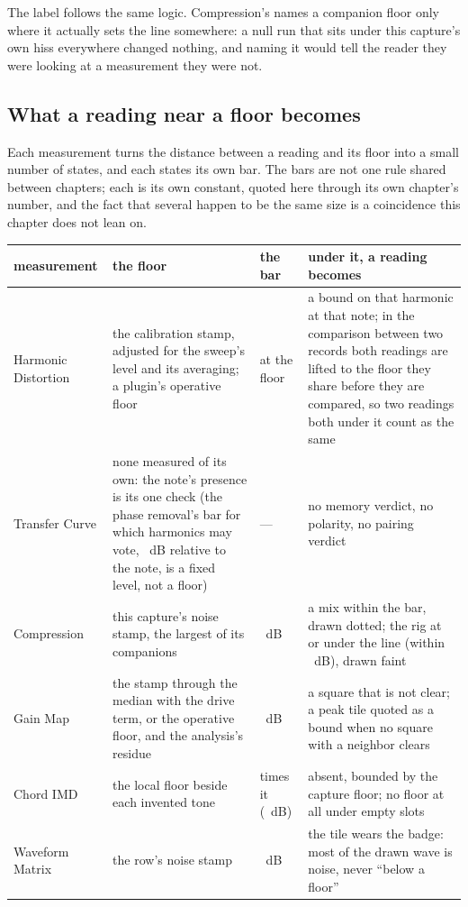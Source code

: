 \documentclass[11pt,a4paper]{article}
\begin{document}
The label follows the same logic. Compression's 
names a companion floor only where it actually sets the line somewhere:
a null run that sits under this capture's own hiss everywhere changed
nothing, and naming it would tell the reader they were looking at a
measurement they were not.

\subsection{What a reading near a floor becomes}

Each measurement turns the distance between a reading and its floor into
a small number of states, and each states its own bar. The bars are not
one rule shared between chapters; each is its own constant, quoted here
through its own chapter's number, and the fact that several happen to be
the same size is a coincidence this chapter does not lean on.

\begin{center}\small
\begin{tabular}{@{}p{2.6cm}p{4.2cm}p{2.3cm}p{4.6cm}@{}}
\toprule
measurement & the floor & the bar & under it, a reading becomes \\
\midrule
Harmonic Distortion & the calibration stamp, adjusted for the sweep's
level and its averaging; a plugin's operative floor & at the floor & a
bound on that harmonic at that note; in the comparison between two records
both readings are lifted to the floor they share before they are
compared, so two readings both under it count as the same \\
Transfer Curve & none measured of its own: the note's presence is its one
check (the phase removal's bar for which harmonics may vote,
\tcMagnitudeFloorDB{}~dB relative to the note, is a fixed level, not a
floor)
& --- & no memory verdict, no polarity, no pairing verdict \\
Compression & this capture's noise stamp, the largest of its companions
& \cmpClearMarginDB{}~dB & a mix within the bar, drawn dotted; the rig at
or under the line (within \cmpAtFloorEpsilonDB{}~dB), drawn faint \\
Gain Map & the stamp through the median with the drive term, or the
operative floor, and the analysis's residue & \gmMinimumMarginDB{}~dB & a
square that is not clear; a peak tile quoted as a bound when no square
with a neighbor clears \\
Chord IMD & the local floor beside each invented tone & \imdGateFactor{}
times it (\imdGateDB{}~dB) & absent, bounded by the capture floor; no
floor at all under \imdMinimumFloorSamples{} empty slots \\
Waveform Matrix & the row's noise stamp & \wmClearMarginDB{}~dB & the
tile wears the badge: most of the drawn wave is noise, never ``below a
floor'' \\
\bottomrule
\end{tabular}
\end{center}
\end{document}
